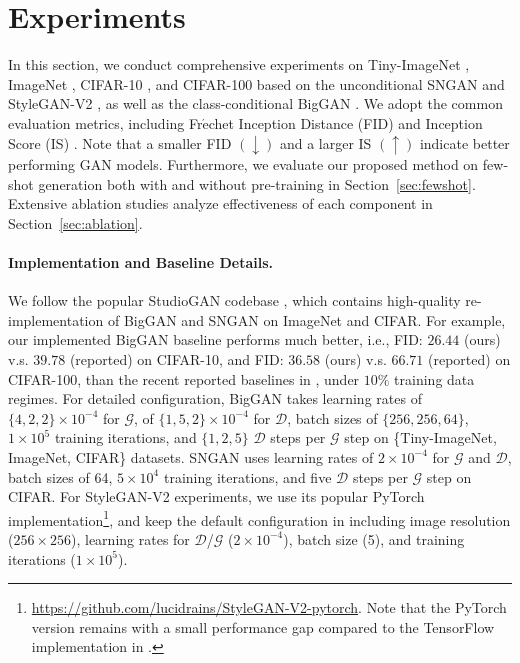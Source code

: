 \documentclass{article}
\begin{document}
\section{Experiments} \label{sec:exp_details}
\vspace{-0.5em}
In this section, we conduct comprehensive experiments on Tiny-ImageNet \cite{wu2017tiny}, ImageNet \cite{deng2009imagenet}, CIFAR-10 \cite{krizhevsky2009learning}, and CIFAR-100 based on the unconditional SNGAN \cite{miyato2018spectral} and StyleGAN-V2 \cite{karras2020analyzing}, as well as the class-conditional BigGAN \cite{brock2018large}. We adopt the common evaluation metrics, including Fr$\acute{\mathrm{e}}$chet Inception Distance (FID) \cite{heusel2017gans} and Inception Score (IS) \cite{salimans2016improved}. Note that a smaller FID $(\downarrow)$ and a larger IS $(\uparrow)$ indicate better performing GAN models. Furthermore, we evaluate our proposed method on few-shot generation both with and without pre-training in Section~\ref{sec:fewshot}. Extensive ablation studies analyze effectiveness of each component in Section~\ref{sec:ablation}.

\vspace{-0.5em}
\paragraph{Implementation and Baseline Details.} We follow the popular StudioGAN codebase \cite{kang2020ContraGAN}, which contains high-quality re-implementation of BigGAN and SNGAN on ImageNet and CIFAR. For example, our implemented BigGAN baseline performs much better, i.e., FID: $26.44$ (ours) v.s. $39.78$ (reported) on CIFAR-10, and FID: $36.58$ (ours)  v.s. $66.71$ (reported) on CIFAR-100, than the recent reported baselines in \cite{zhao2020diffaugment}, under $10\%$ training data regimes. For detailed configuration, BigGAN takes learning rates of $\{4,2,2\}\times10^{-4}$ for $\mathcal{G}$, of $\{1,5,2\}\times10^{-4}$ for $\mathcal{D}$, batch sizes of $\{256,256,64\}$, $1\times10^{5}$ training iterations, and $\{1,2,5\}$ $\mathcal{D}$ steps per $\mathcal{G}$ step on \{Tiny-ImageNet, ImageNet, CIFAR\} datasets. SNGAN uses learning rates of $2\times10^{-4}$ for $\mathcal{G}$ and $\mathcal{D}$, batch sizes of 64, $5\times10^{4}$ training iterations, and five $\mathcal{D}$ steps per $\mathcal{G}$ step on CIFAR. For StyleGAN-V2 experiments, we use its popular PyTorch implementation\footnote{\href{https://github.com/lucidrains/StyleGAN-V2-pytorch}{https://github.com/lucidrains/StyleGAN-V2-pytorch}. Note that the PyTorch version remains with a small performance gap compared to the TensorFlow implementation in \cite{zhao2020diffaugment}.}, and keep the default configuration in \cite{zhao2020diffaugment} including image resolution ($256\times256$), learning rates for $\mathcal{D}$/$\mathcal{G}$ ($2\times10^{-4}$), batch size (5), and training iterations ($1\times10^{5}$). 
\end{document}
